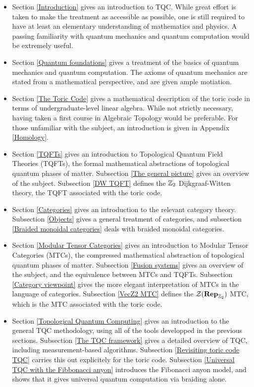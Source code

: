 \documentclass{article}
\theoremstyle{definition}
\numberwithin{figure}{section}
\begin{document}
\begin{itemize}
\item Section \ref{Introduction} gives an introduction to TQC. While great effort is taken to make the treatment as accessible as possible, one is still required to have at least an elementary understanding of mathematics and physics. A passing familiarity with quantum mechanics and quantum computation would be extremely useful.

\item Section \ref{Quantum foundations} gives a treatment of the basics of quantum mechanics and quantum computation. The axioms of quantum mechanics are stated from a mathematical perspective, and are given ample motiation.

\item Section \ref{The Toric Code} gives a mathematical description of the toric code in terms of undergraduate-level linear algebra. While not strictly necessary, having taken a first course in Algebraic Topology would be preferable. For those unfamiliar with the subject, an introduction is given in Appendix \ref{Homology}. 

\item Section \ref{TQFTs} gives an introduction to Topological Quantum Field Theories (TQFTs), the formal mathematical abstractions of topological quantum phases of matter. Subsection \ref{The general picture} gives an overview of the subject. Subsection \ref{DW TQFT} defines the $\mathbb{Z}_2$ Dijkgraaf-Witten theory, the TQFT associated with the toric code.

\item Section \ref{Categories} gives an introduction to the relevant category theory. Subsection \ref{Objects} gives a general treatment of categories, and subsection \ref{Braided monoidal categories} deals with braided monoidal categories.

\item Section \ref{Modular Tensor Categories} gives an introduction to Modular Tensor Categories (MTCs), the compressed mathematical abstraction of topological quantum phases of matter. Subsection \ref{Fusion systems} gives an overview of the subject, and the equivalence between MTCs and TQFTs. Subsection \ref{Category viewpoint} gives the more elegant interpretation of MTCs in the language of categories. Subsection \ref{VecZ2 MTC} defines the $\mathcal{Z}(\bold{Rep}_{\mathbb{Z}_2})$ MTC, which is the MTC associated with the toric code.

\item Section \ref{Topological Quantum Computing} gives an introduction to the general TQC methodology, using all of the tools developped in the previous sections. Subsection \ref{The TQC framework} gives a detailed overview of TQC, including measurement-based algorithms. Subsection \ref{Revisiting toric code TQC} carries this out explicitely for the toric code. Subsection \ref{Universal TQC with the Fibbonacci anyon} introduces the Fibonacci anyon model, and shows that it gives universal quantum computation via braiding alone.

\end{itemize}
\end{document}
